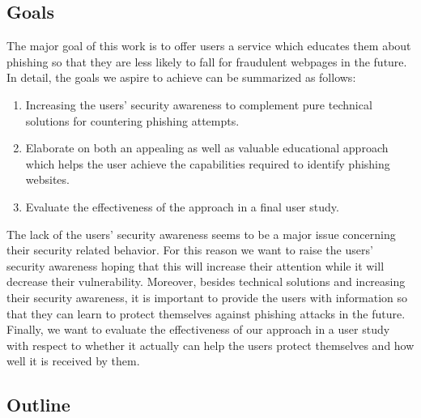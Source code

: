 \subsection{Goals}
\label{s:goals}
The major goal of this work is to offer users a service which educates them about phishing so that they are less likely to fall for fraudulent webpages in the future.
In detail, the goals we aspire to achieve can be summarized as follows:

\begin{enumerate}
	\item Increasing the users' security awareness to complement pure technical solutions for countering phishing attempts.
	\item Elaborate on both an appealing as well as valuable educational approach which helps the user achieve the capabilities required to identify phishing websites.
	\item Evaluate the effectiveness of the approach in a final user study.
\end{enumerate}
The lack of the users' security awareness seems to be a major issue concerning their security related behavior.
 For this reason we want to raise the users' security awareness hoping that this will increase their attention while it will decrease their vulnerability.
 Moreover, besides technical solutions and increasing their security awareness, it is important to provide the users with information so that they can learn to protect themselves against phishing attacks in the future.
Finally, we want to evaluate the effectiveness of our approach in a user study with respect to whether it actually can help the users protect themselves and how well it is received by them.

\subsection{Outline}


